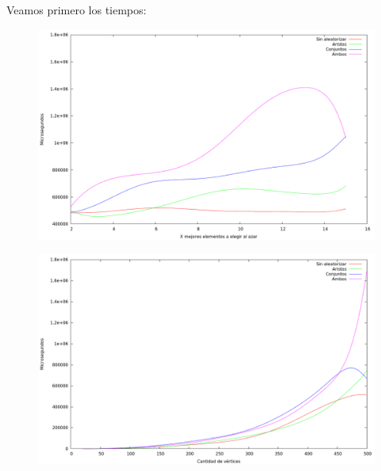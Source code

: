 Veamos primero los tiempos:

\vspace*{0.5cm}

\begin{figure}[h]
  \begin{center}
    \includegraphics[scale=0.35]{imagenes/grasp-local-x-tiempo.png}
  \end{center}
\end{figure}

\vspace*{0.5cm}

\vspace*{0.5cm}

\begin{figure}[h]
  \begin{center}
    \includegraphics[scale=0.35]{imagenes/grasp-local-n-tiempo.png}
  \end{center}
\end{figure}

